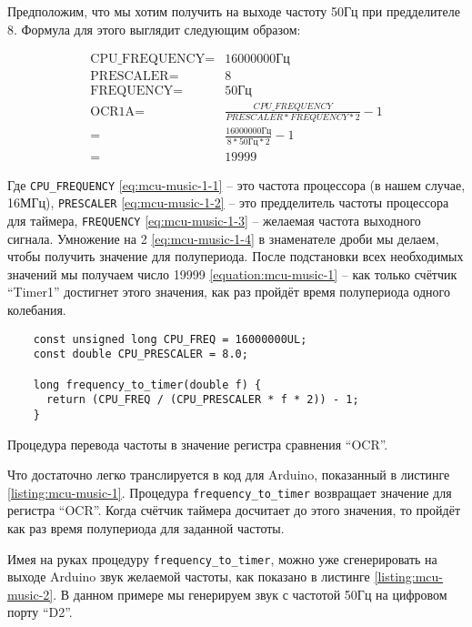 \documentclass[../sparc.tex]{subfiles}
\begin{document}
Предположим, что мы хотим получить на выходе частоту 50Гц при предделителе 8.
Формула для этого выглядит следующим образом:

\begin{align}
  \mbox{CPU\_FREQUENCY} =& 16000000 \mbox{Гц} \label{eq:mcu-music-1-1}\\
  \mbox{PRESCALER} =& 8 \label{eq:mcu-music-1-2}\\
  \mbox{FREQUENCY} =& 50 \mbox{Гц} \label{eq:mcu-music-1-3}\\
  \mbox{OCR1A} =& \frac{CPU\_FREQUENCY}{PRESCALER * FREQUENCY * 2} - 1
  \label{eq:mcu-music-1-4}\\
  =& \frac{16000000 \mbox{Гц}}{8 * 50 \mbox{Гц} * 2} - 1
  \label{eq:mcu-music-1-5}\\
  =& 19999
  \label{equation:mcu-music-1}
\end{align}

Где \texttt{CPU\_FREQUENCY} \eqref{eq:mcu-music-1-1} -- это частота процессора (в
нашем случае, 16МГц), \texttt{PRESCALER} \eqref{eq:mcu-music-1-2} -- это
предделитель частоты процессора для таймера, \texttt{FREQUENCY}
\eqref{eq:mcu-music-1-3} -- желаемая частота выходного сигнала.  Умножение на 2
\eqref{eq:mcu-music-1-4} в знаменателе дроби мы делаем, чтобы получить значение
для полупериода.  После подстановки всех необходимых значений мы получаем число
19999 \eqref{equation:mcu-music-1} -- как только счётчик ``Timer1'' достигнет
этого значения, как раз пройдёт время полупериода одного колебания.

\begin{listing}[ht]
  \begin{verbatim}
    const unsigned long CPU_FREQ = 16000000UL;
    const double CPU_PRESCALER = 8.0;

    long frequency_to_timer(double f) {
      return (CPU_FREQ / (CPU_PRESCALER * f * 2)) - 1;
    }
  \end{verbatim}
  \caption{Процедура перевода частоты в значение регистра сравнения ``OCR''.}
  \label{listing:mcu-music-1}
\end{listing}

Что достаточно легко транслируется в код для Arduino, показанный в листинге
\ref{listing:mcu-music-1}.  Процедура \texttt{frequency_to_timer}
возвращает значение для регистра ``OCR''.  Когда счётчик таймера досчитает до
этого значения, то пройдёт как раз время полупериода для заданной частоты.

Имея на руках процедуру \texttt{frequency_to_timer}, можно уже
сгенерировать на выходе Arduino звук желаемой частоты, как показано в листинге
\ref{listing:mcu-music-2}.  В данном примере мы генерируем звук с частотой 50Гц
на цифровом порту ``D2''.
\end{document}

